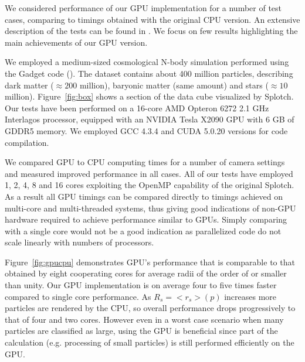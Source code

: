 We considered performance of our GPU implementation for a number of test cases,
comparing to timings obtained with the original CPU version. An extensive description of the 
tests can be found in \citet{cusplotch}. We focus on few results highlighting the main achievements
of our GPU version.

We employed a medium-sized cosmological
N-body simulation performed using the Gadget code (\citet{springel2005}). The dataset contains about
400 million particles, describing dark matter ($\approx 200$ million),
baryonic matter (same amount) and stars ($\approx 10$ million).
Figure~\ref{fig:box} shows a section of the data cube visualized by Splotch.
Our tests have been performed on a 16-core AMD Opteron 6272 2.1 GHz Interlagos processor, equipped with 
an NVIDIA Tesla X2090 GPU with 6 GB of GDDR5 memory.
We employed GCC 4.3.4 and CUDA 5.0.20 versions for code compilation.

We compared GPU to CPU computing times for a number of camera settings and measured improved performance in all cases. All of our tests have employed
1, 2, 4, 8 and 16 cores exploiting the OpenMP capability of the original Splotch. As a result all GPU timings can be compared directly to
timings achieved on multi-core and multi-threaded systems, thus giving good indications of non-GPU hardware required to achieve performance similar to GPUs. Simply comparing with a single core would not be a good indication as parallelized code do not scale linearly with numbers of processors.

Figure~\ref{fig:gpucpu} demonstrates GPU's performance that is
comparable to that obtained by eight cooperating cores for average radii of the order of or smaller
than unity. Our GPU implementation is on average four to five times faster compared to single
core performance. As $R_s=<r_s>(p)$ increases more particles are rendered by the CPU, so overall performance drops progressively to that of four and two cores. However even in
a worst case scenario when many particles are classified as large, using the GPU is beneficial since part of the calculation (e.g. processing of small particles)
is still performed efficiently on the GPU.

